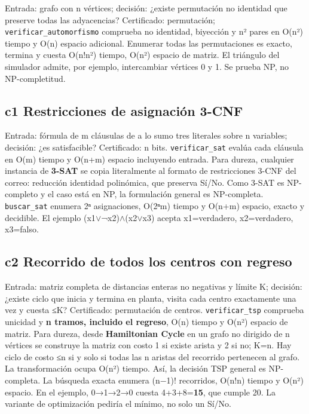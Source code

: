 \documentclass[12pt,a4paper]{article}
\begin{document}
Entrada: grafo con n vértices; decisión: ¿existe permutación no identidad que preserve todas las adyacencias? Certificado: permutación; \texttt{verificar\_automorfismo} comprueba no identidad, biyección y n² pares en O(n²) tiempo y O(n) espacio adicional. Enumerar todas las permutaciones es exacto, termina y cuesta O(n!n²) tiempo, O(n²) espacio de matriz. El triángulo del simulador admite, por ejemplo, intercambiar vértices 0 y 1. Se prueba NP, no NP-completitud.


\subsection{c1 Restricciones de asignación 3-CNF}

Entrada: fórmula de m cláusulas de a lo sumo tres literales sobre n variables; decisión: ¿es satisfacible? Certificado: n bits. \texttt{verificar\_sat} evalúa cada cláusula en O(m) tiempo y O(n+m) espacio incluyendo entrada. Para dureza, cualquier instancia de \textbf{3-SAT} se copia literalmente al formato de restricciones 3-CNF del correo: reducción identidad polinómica, que preserva Sí/No. Como 3-SAT es NP-completo y el caso está en NP, la formulación general es NP-completa. \texttt{buscar\_sat} enumera 2ⁿ asignaciones, O(2ⁿm) tiempo y O(n+m) espacio, exacto y decidible. El ejemplo (x1\ensuremath{\lor}¬x2)\ensuremath{\land}(x2\ensuremath{\lor}x3) acepta x1=verdadero, x2=verdadero, x3=falso.


\subsection{c2 Recorrido de todos los centros con regreso}

Entrada: matriz completa de distancias enteras no negativas y límite K; decisión: ¿existe ciclo que inicia y termina en planta, visita cada centro exactamente una vez y cuesta ≤K? Certificado: permutación de centros. \texttt{verificar\_tsp} comprueba unicidad y \textbf{n tramos, incluido el regreso}, O(n) tiempo y O(n²) espacio de matriz. Para dureza, desde \textbf{Hamiltonian Cycle} en un grafo no dirigido de n vértices se construye la matriz con costo 1 si existe arista y 2 si no; K=n. Hay ciclo de costo ≤n si y solo si todas las n aristas del recorrido pertenecen al grafo. La transformación ocupa O(n²) tiempo. Así, la decisión TSP general es NP-completa. La búsqueda exacta enumera (n−1)! recorridos, O(n!n) tiempo y O(n²) espacio. En el ejemplo, 0→1→2→0 cuesta 4+3+8=\textbf{15}, que cumple 20. La variante de optimización pediría el mínimo, no solo un Sí/No.
\end{document}
